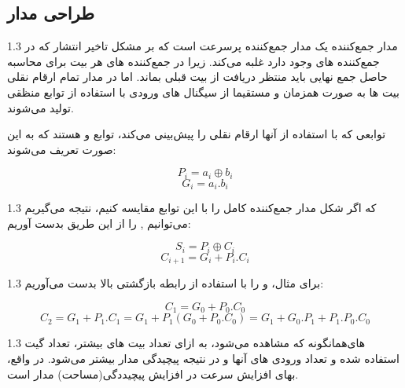 \documentclass[a4paper,12pt]{article}
\numberwithin{figure}{subsection}
\begin{document}
\subsection{طراحی مدار}
\leavevmode\par
\vspace{0.3cm}

\begin{spacing}{1.3}
مدار جمع‌کننده  یک مدار جمع‌کننده پرسرعت است که بر مشکل تاخیر انتشار که در جمع‌کننده های  وجود دارد غلبه می‌کند. زیرا در جمع‌کننده های  هر بیت برای محاسبه حاصل جمع نهایی باید منتظر دریافت  از بیت قبلی بماند. اما در مدار  تمام ارقام نقلی بیت ها به صورت همزمان و مستقیما از سیگنال های ورودی با استفاده از توابع منظقی تولید می‌شوند.

توابعی که  با استفاده از آنها ارقام نقلی را پیش‌بینی می‌کند، توابع  و  هستند که به این صورت تعریف می‌شوند:
\end{spacing}

\begin{latin}
$$P_i = a_i \oplus b_i$$
$$G_i = a_i . b_i$$
\end{latin}

\begin{spacing}{1.3}
که اگر شکل مدار جمع‌کننده کامل را با این توابع مقایسه کنیم، نتیجه می‌گیریم می‌توانیم  ,  را از این طریق بدست آوریم:
\end{spacing}

\begin{latin}
$$S_i = P_i \oplus C_i$$
$$C_{i+1} = G_i + P_i . C_i$$
\end{latin}

\begin{spacing}{1.3}
برای مثال،  و  را با استفاده از رابطه بازگشتی بالا بدست می‌آوریم:
\end{spacing}

\begin{latin}
$$C_1 = G_0 + P_0 . C_0$$
$$C_2 = G_1 + P_1 . C_1 = G_1 + P_1(G_0 + P_0 . C_0) = G_1 + G_0 . P_1 + P_1 . P_0 . C_0$$
\end{latin}

\begin{spacing}{1.3}
همانگونه که مشاهده می‌شود، به ازای تعداد بیت های بیشتر، تعداد گیت‎‌های استفاده شده و تعداد ورودی های آنها و در نتیجه پیچیدگی مدار بیشتر می‌شود. در واقع، بهای افزایش سرعت در  افزایش پیچیددگی(مساحت) مدار است.
\end{spacing}
\end{document}
